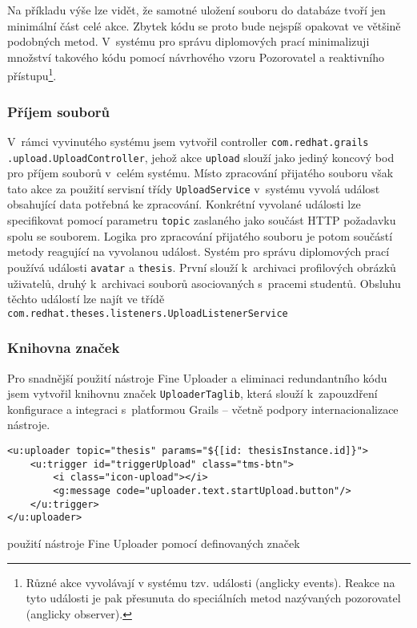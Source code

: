 Na příkladu výše lze vidět, že samotné uložení souboru do databáze tvoří jen minimální část celé akce. Zbytek kódu se proto bude nejspíš opakovat ve většině podobných metod. V~systému pro správu diplomových prací minimalizuji množství takového kódu pomocí návrhového vzoru Pozorovatel a reaktivního přístupu\footnote{Různé akce vyvolávají v systému tzv. události (anglicky events). Reakce na tyto události je pak přesunuta do speciálních metod nazývaných pozorovatel (anglicky observer).}.

\subsubsection{\textbf{Příjem souborů}}
V~rámci vyvinutého systému jsem vytvořil controller \texttt{com.redhat.grails\\.upload.UploadController}, jehož akce \texttt{upload} slouží jako jediný koncový bod pro příjem souborů v~celém systému. Místo zpracování přijatého souboru však tato akce za použití servisní třídy \texttt{UploadService} v~systému vyvolá událost obsahující data potřebná ke zpracování. Konkrétní vyvolané události lze specifikovat pomocí parametru \texttt{topic} zaslaného jako součást HTTP požadavku spolu se souborem. Logika pro zpracování přijatého souboru je potom součástí metody reagující na vyvolanou událost. Systém pro správu diplomových prací používá události \texttt{avatar} a \texttt{thesis}. První slouží k~archivaci profilových obrázků uživatelů, druhý k~archivaci souborů asociovaných s~pracemi studentů. Obsluhu těchto událostí lze najít ve třídě \texttt{com.redhat.theses.listeners.UploadListenerService}

\subsubsection{\textbf{Knihovna značek}}
Pro snadnější použití nástroje Fine Uploader a eliminaci redundantního kódu jsem vytvořil knihovnu značek \texttt{UploaderTaglib}, která slouží k~zapouzdření konfigurace a integraci s~platformou Grails -- včetně podpory internacionalizace nástroje.
\begin{example}
\centering
\begin{lstlisting}
<u:uploader topic="thesis" params="${[id: thesisInstance.id]}">
    <u:trigger id="triggerUpload" class="tms-btn">
        <i class="icon-upload"></i>
        <g:message code="uploader.text.startUpload.button"/>
    </u:trigger>
</u:uploader>
\end{lstlisting}
\caption{použití nástroje Fine Uploader pomocí definovaných značek}
\end{example}
